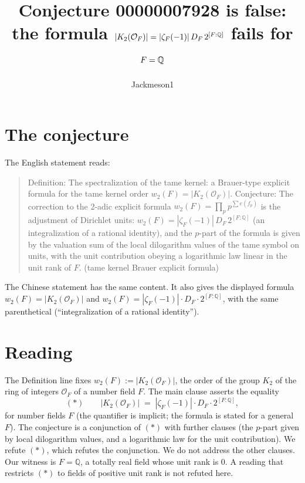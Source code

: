 \documentclass[11pt]{article}
\title{Conjecture 00000007928 is false:\\ the formula $|K_2(\OO_F)| = |\zeta_F(-1)|\,D_F\,2^{[F:\Q]}$ fails for $F=\Q$}
\author{Jackmeson1}
\date{}
\theoremstyle{remark}
\newcommand{\Q}{\mathbb{Q}}
\newcommand{\OO}{\mathcal{O}}
\begin{document}
\maketitle

\section{The conjecture}

The English statement reads:

\begin{quote}\small
Definition: The spectralization of the tame kernel: a Brauer-type explicit formula for the tame
kernel order $w_2(F) = |K_2(\OO_F)|$. Conjecture: The correction to the 2-adic explicit formula
$w_2(F) = \prod_p p^{\sum e(f_p)}$ is the adjustment of Dirichlet units:
$w_2(F) = |\zeta_F(-1)|\, D_F\, 2^{[F:\Q]}$ (an integralization of a rational identity), and the
$p$-part of the formula is given by the valuation sum of the local dilogarithm values of the tame
symbol on units, with the unit contribution obeying a logarithmic law linear in the unit rank of
$F$. (tame kernel Brauer explicit formula)
\end{quote}

The Chinese statement has the same content. It also gives the displayed formula
$w_2(F)=|K_2(\OO_F)|$ and $w_2(F)=|\zeta_F(-1)|\cdot D_F\cdot 2^{[F:\Q]}$, with the same
parenthetical (``integralization of a rational identity'').

\section{Reading}

The Definition line fixes $w_2(F) := |K_2(\OO_F)|$, the order of the group $K_2$ of the ring of
integers $\OO_F$ of a number field $F$. The main clause asserts the equality
\[
  (\ast)\qquad |K_2(\OO_F)| \;=\; |\zeta_F(-1)| \cdot D_F \cdot 2^{[F:\Q]},
\]
for number fields $F$ (the quantifier is implicit; the formula is stated for a general $F$). The
conjecture is a conjunction of $(\ast)$ with further clauses (the $p$-part given by local
dilogarithm values, and a logarithmic law for the unit contribution). We refute $(\ast)$, which
refutes the conjunction. We do not address the other clauses. Our witness is $F=\Q$, a totally
real field whose unit rank is $0$. A reading that restricts $(\ast)$ to fields of positive unit rank
is not refuted here.
\end{document}
